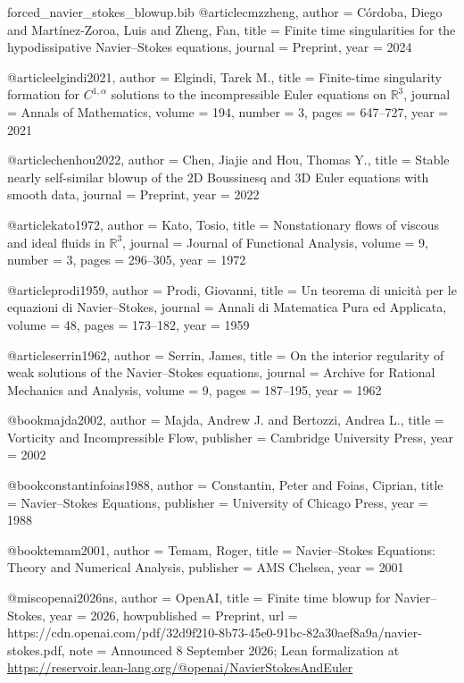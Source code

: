 \begin{filecontents*}{forced_navier_stokes_blowup.bib}
@article{cmzzheng,
  author  = {C{\'o}rdoba, Diego and Mart{\'i}nez-Zoroa, Luis and Zheng, Fan},
  title   = {Finite time singularities for the hypodissipative {N}avier--{S}tokes equations},
  journal = {Preprint},
  year    = {2024}
}

@article{elgindi2021,
  author  = {Elgindi, Tarek M.},
  title   = {Finite-time singularity formation for {$C^{1,\alpha}$} solutions to the incompressible {E}uler equations on {$\mathbb{R}^3$}},
  journal = {Annals of Mathematics},
  volume  = {194},
  number  = {3},
  pages   = {647--727},
  year    = {2021}
}

@article{chenhou2022,
  author  = {Chen, Jiajie and Hou, Thomas Y.},
  title   = {Stable nearly self-similar blowup of the {$2$D} {B}oussinesq and {$3$D} {E}uler equations with smooth data},
  journal = {Preprint},
  year    = {2022}
}

@article{kato1972,
  author  = {Kato, Tosio},
  title   = {Nonstationary flows of viscous and ideal fluids in {$\mathbb{R}^3$}},
  journal = {Journal of Functional Analysis},
  volume  = {9},
  number  = {3},
  pages   = {296--305},
  year    = {1972}
}

@article{prodi1959,
  author  = {Prodi, Giovanni},
  title   = {Un teorema di unicit{\`a} per le equazioni di {N}avier--{S}tokes},
  journal = {Annali di Matematica Pura ed Applicata},
  volume  = {48},
  pages   = {173--182},
  year    = {1959}
}

@article{serrin1962,
  author  = {Serrin, James},
  title   = {On the interior regularity of weak solutions of the {N}avier--{S}tokes equations},
  journal = {Archive for Rational Mechanics and Analysis},
  volume  = {9},
  pages   = {187--195},
  year    = {1962}
}

@book{majda2002,
  author    = {Majda, Andrew J. and Bertozzi, Andrea L.},
  title     = {Vorticity and Incompressible Flow},
  publisher = {Cambridge University Press},
  year      = {2002}
}

@book{constantinfoias1988,
  author    = {Constantin, Peter and Foias, Ciprian},
  title     = {{N}avier--{S}tokes Equations},
  publisher = {University of Chicago Press},
  year      = {1988}
}

@book{temam2001,
  author    = {Temam, Roger},
  title     = {{N}avier--{S}tokes Equations: Theory and Numerical Analysis},
  publisher = {AMS Chelsea},
  year      = {2001}
}

@misc{openai2026ns,
  author       = {{OpenAI}},
  title        = {Finite time blowup for {N}avier--{S}tokes},
  year         = {2026},
  howpublished = {Preprint},
  url          = {https://cdn.openai.com/pdf/32d9f210-8b73-45e0-91bc-82a30aef8a9a/navier-stokes.pdf},
  note         = {Announced 8 September 2026; Lean formalization at \url{https://reservoir.lean-lang.org/@openai/NavierStokesAndEuler}}
}


\end{filecontents*}
